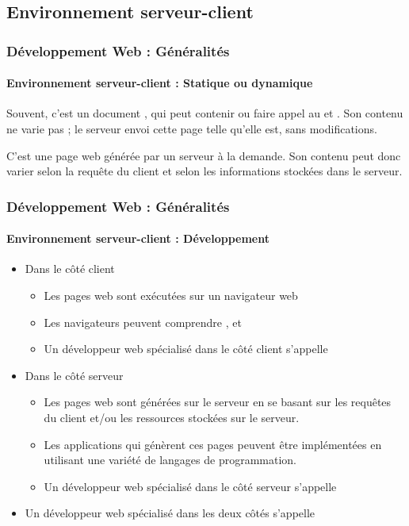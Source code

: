 \documentclass[xcolor=table]{beamer}
\begin{document}
\subsection{Environnement serveur-client}

\begin{frame}
\frametitle{Développement Web : Généralités}
\framesubtitle{Environnement serveur-client : Statique ou dynamique}

\begin{definition}
	Souvent, c'est un document , qui peut contenir ou faire appel au  et .
	Son contenu ne varie pas ; le serveur envoi cette page telle qu'elle est, sans modifications.
\end{definition}

\begin{definition}
	C'est une page web générée par un serveur à la demande. 
	Son contenu peut donc varier selon la requête du client et selon les informations stockées dans le serveur. 
\end{definition}

\end{frame}

\begin{frame}
\frametitle{Développement Web : Généralités}
\framesubtitle{Environnement serveur-client : Développement}

\begin{itemize}
	\item Dans le côté client 
	\begin{itemize}
		\item Les pages web sont exécutées sur un navigateur web 
		\item Les navigateurs peuvent comprendre ,  et 
		\item Un développeur web spécialisé dans le côté client s'appelle 
	\end{itemize}
	\item Dans le côté serveur
	\begin{itemize}
		\item Les pages web sont générées sur le serveur en se basant sur les requêtes du client et/ou les ressources stockées sur le serveur.
		\item Les applications qui génèrent ces pages peuvent être implémentées en utilisant une variété de langages de programmation.
		\item Un développeur web spécialisé dans le côté serveur s'appelle 
	\end{itemize}
	\item Un développeur web spécialisé dans les deux côtés s'appelle 
\end{itemize}


\end{frame}
\end{document}
